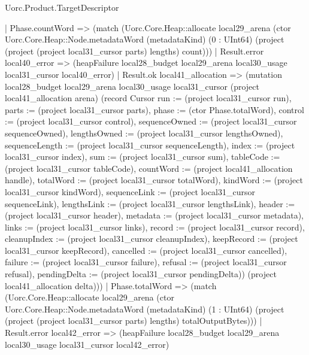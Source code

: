 \begin{lexlean}{Uorc.Product.TargetDescriptor}
\begin{semanticmodule}
{    | Phase.countWord => (match (Uorc.Core.Heap::allocate local29_arena (ctor Uorc.Core.Heap::Node.metadataWord (metadataKind) (0 : UInt64) (project (project (project local31_cursor parts) lengths) count)))
      | Result.error local40_error => (heapFailure local28_budget local29_arena local30_usage local31_cursor local40_error)
      | Result.ok local41_allocation => (mutation local28_budget local29_arena local30_usage local31_cursor (project local41_allocation arena) (record Cursor {run := (project local31_cursor run), parts := (project local31_cursor parts), phase := (ctor Phase.totalWord), control := (project local31_cursor control), sequenceOwned := (project local31_cursor sequenceOwned), lengthsOwned := (project local31_cursor lengthsOwned), sequenceLength := (project local31_cursor sequenceLength), index := (project local31_cursor index), sum := (project local31_cursor sum), tableCode := (project local31_cursor tableCode), countWord := (project local41_allocation handle), totalWord := (project local31_cursor totalWord), kindWord := (project local31_cursor kindWord), sequenceLink := (project local31_cursor sequenceLink), lengthsLink := (project local31_cursor lengthsLink), header := (project local31_cursor header), metadata := (project local31_cursor metadata), links := (project local31_cursor links), record := (project local31_cursor record), cleanupIndex := (project local31_cursor cleanupIndex), keepRecord := (project local31_cursor keepRecord), cancelled := (project local31_cursor cancelled), failure := (project local31_cursor failure), refusal := (project local31_cursor refusal), pendingDelta := (project local31_cursor pendingDelta)}) (project local41_allocation delta)))
    | Phase.totalWord => (match (Uorc.Core.Heap::allocate local29_arena (ctor Uorc.Core.Heap::Node.metadataWord (metadataKind) (1 : UInt64) (project (project (project local31_cursor parts) lengths) totalOutputBytes)))
      | Result.error local42_error => (heapFailure local28_budget local29_arena local30_usage local31_cursor local42_error)
}
\end{semanticmodule}
\end{lexlean}
